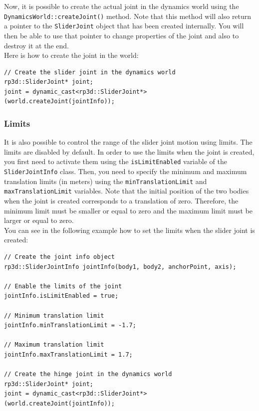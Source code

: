 \documentclass[a4paper,12pt]{article}
\begin{document}
    \vspace{0.6cm}

    Now, it is possible to create the actual joint in the dynamics world using the \texttt{DynamicsWorld::createJoint()} method.
    Note that this method will also return a pointer to the \texttt{SliderJoint} object that has been created internally. You will then
    be able to use that pointer to change properties of the joint and also to destroy it at the end. \\

    Here is how to create the joint in the world: \\

    \begin{lstlisting}
// Create the slider joint in the dynamics world
rp3d::SliderJoint* joint;
joint = dynamic_cast<rp3d::SliderJoint*>(world.createJoint(jointInfo));
  \end{lstlisting}

    \subsubsection{Limits}

    It is also possible to control the range of the slider joint motion using limits. The limits are disabled by default. In order to use the limits when the joint is created, you first
    need to activate them using the \texttt{isLimitEnabled} variable of the \texttt{SliderJointInfo} class. Then, you need to specify the minimum and maximum translation limits
    (in meters) using the \texttt{minTranslationLimit} and \texttt{maxTranslation\-Limit} variables. Note that the initial position of the two bodies when the joint is created
    corresponds to a translation of zero. Therefore, the minimum limit must be smaller or equal to zero and the maximum limit must be larger or equal to zero. \\

    You can see in the following example how to set the limits when the slider joint is created: \\

    \begin{lstlisting}
// Create the joint info object
rp3d::SliderJointInfo jointInfo(body1, body2, anchorPoint, axis);

// Enable the limits of the joint
jointInfo.isLimitEnabled = true;

// Minimum translation limit
jointInfo.minTranslationLimit = -1.7;

// Maximum translation limit
jointInfo.maxTranslationLimit = 1.7;

// Create the hinge joint in the dynamics world
rp3d::SliderJoint* joint;
joint = dynamic_cast<rp3d::SliderJoint*>(world.createJoint(jointInfo));
  \end{lstlisting}
\end{document}
